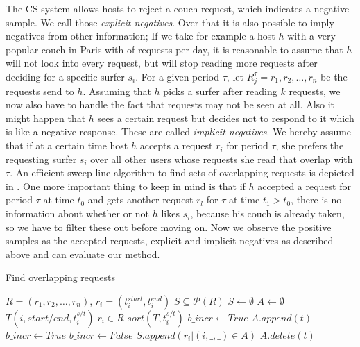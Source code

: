 The CS system allows hosts to reject a couch request, which indicates a negative sample. We call those \textit{explicit negatives}. Over that it is also possible to imply negatives from other information; If we take for example a host $h$ with a very popular couch in Paris with  of requests per day, it is reasonable to assume that $h$ will not look into every request, but will stop reading more requests after deciding for a specific surfer $s_i$. For a given period $\tau$, let $R_{j}^{\tau} = r_1, r_2,\ldots,r_n$ be the requests send to $h$. Assuming that $h$ picks a surfer after reading $k$ requests, we now also have to handle the fact that requests may not be seen at all. Also it might happen that $h$ sees a certain request but decides not to respond to it which is like a negative response. These are called \textit{implicit negatives}. We hereby assume that if at a certain time host $h$ accepts a request $r_i$ for period $\tau$, she prefers the requesting surfer $s_i$ over all other users whose requests she read that overlap with $\tau$. An efficient sweep-line algorithm to find sets of overlapping requests is depicted in . One more important thing to keep in mind is that if $h$ accepted a request for period $\tau$ at time $t_0$ and gets another request $r_l$ for $\tau$ at time $t_1 > t_0$, there is no information about whether or not $h$ likes $s_i$, because his couch is already taken, so we have to filter these out before moving on. Now we observe the positive samples as the accepted requests, explicit and implicit negatives as described above and can evaluate our method.

\begin{algorithm}
\caption{Find overlapping requests}
\label{alg:overlap}
\begin{algorithmic} 
\REQUIRE $R = (r_1, r_2,\ldots,r_n)$, $r_i = (t_i^{start}, t_i^{end})$
\ENSURE $S\subseteq \mathcal{P}(R)$ 
\STATE $S \leftarrow \emptyset$
\STATE $A \leftarrow \emptyset$ 
\STATE $T {(i, start/end, t_i^{s/t}) |r_i \in R}$
\STATE $sort(T, t_i^{s/t})$ 
\STATE $b\_incr \leftarrow True$ 
\STATE $A.append(t)$
\STATE $b\_incr \leftarrow True$
\ELSE
{}
\STATE $b\_incr \leftarrow False$
\STATE $S.append({r_i | (i, \_, \_) \in A})$
\ENDIF
\STATE $A.delete(t)$
\ENDIF
\ENDFOR
\end{algorithmic}
\end{algorithm}

